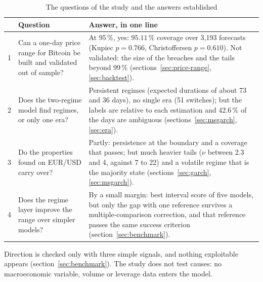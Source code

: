 \documentclass[12pt,a4paper]{article}
\begin{document}
\begin{table}[H]
	\centering
	\small
	\caption{The questions of the study and the answers established}
	\label{tab:questions}
	\begin{tabular}{|c|p{5.2cm}|p{6.6cm}|}
		\hline
		& Question & Answer, in one line \\
		\hline
		1 & Can a one-day price range for Bitcoin be built and validated out of sample? & At 95\,\%, yes: $95.11\,\%$ coverage over 3,193 forecasts (Kupiec $p=0.766$, Christoffersen $p=0.610$). Not validated: the size of the breaches and the tails beyond 99\,\% (sections~\ref{sec:price-range}, \ref{sec:backtest}). \\
		\hline
		2 & Does the two-regime model find regimes, or only one era? & Persistent regimes (expected durations of about 73 and 36 days), no single era (51 switches); but the labels are relative to each estimation and 42.6\,\% of the days are ambiguous (sections~\ref{sec:msgarch}, \ref{sec:era}). \\
		\hline
		3 & Do the properties found on EUR/USD carry over? & Partly: persistence at the boundary and a coverage that passes; but much heavier tails ($\nu$ between 2.3 and 4, against 7 to 22) and a volatile regime that is the majority state (sections~\ref{sec:garch}, \ref{sec:msgarch}). \\
		\hline
		4 & Does the regime layer improve the range over simpler models? & By a small margin: best interval score of five models, but only the gap with one reference survives a multiple-comparison correction, and that reference passes the same success criterion (section~\ref{sec:benchmark}). \\
		\hline
	\end{tabular}
\end{table}

Direction is checked only with three simple signals, and nothing exploitable appears (section~\ref{sec:benchmark}). The study does not test causes: no macroeconomic variable, volume or leverage data enters the model.
\end{document}
